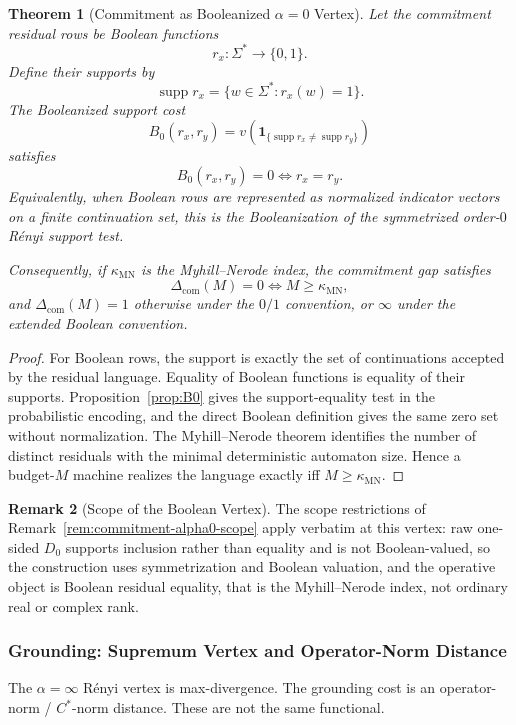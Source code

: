 \documentclass[12pt]{article}
\newtheorem{theorem}{Theorem}[section]
\theoremstyle{definition}
\newtheorem{remark}[theorem]{Remark}
\DeclareMathOperator{\supp}{supp}
\newcommand{\Com}{\Delta_{\mathrm{com}}}
\newcommand{\kappaMN}{\kappa_{\mathrm{MN}}}
\begin{document}
\begin{theorem}[Commitment as Booleanized $\alpha=0$ Vertex]
\label{thm:commitment-alpha0}
Let the commitment residual rows be Boolean functions
\[
r_x:\Sigma^*\to\{0,1\}.
\]
Define their supports by
\[
\supp r_x=\{w\in\Sigma^*:r_x(w)=1\}.
\]
The Booleanized support cost
\[
B_0(r_x,r_y)
=
v(\mathbf 1_{\{\supp r_x\neq\supp r_y\}})
\]
satisfies
\[
B_0(r_x,r_y)=0
\iff
r_x=r_y.
\]
Equivalently, when Boolean rows are represented as normalized indicator
vectors on a finite continuation set, this is the Booleanization of the
symmetrized order-$0$ R\'enyi support test.

Consequently, if $\kappaMN$ is the Myhill--Nerode index, the commitment gap
satisfies
\[
\Com(M)=0
\iff
M\ge\kappaMN,
\]
and $\Com(M)=1$ otherwise under the $0/1$ convention, or $\infty$ under the
extended Boolean convention.
\end{theorem}

\begin{proof}
For Boolean rows, the support is exactly the set of continuations accepted by
the residual language.  Equality of Boolean functions is equality of their
supports.  Proposition~\ref{prop:B0} gives the support-equality test in the
probabilistic encoding, and the direct Boolean definition gives the same zero
set without normalization.  The Myhill--Nerode theorem identifies the number of
distinct residuals with the minimal deterministic automaton size.  Hence a
budget-$M$ machine realizes the language exactly iff $M\ge\kappaMN$.
\end{proof}

\begin{remark}[Scope of the Boolean Vertex]
\label{rem:exponent-alpha0-scope}
The scope restrictions of Remark~\ref{rem:commitment-alpha0-scope} apply
verbatim at this vertex: raw one-sided $D_0$ supports inclusion rather than
equality and is not Boolean-valued, so the construction uses symmetrization and
Boolean valuation, and the operative object is Boolean residual equality, that
is the Myhill--Nerode index, not ordinary real or complex rank.
\end{remark}

\subsubsection{Grounding: Supremum Vertex and Operator-Norm Distance}
\label{subsubsec:exponent-grounding}

The $\alpha=\infty$ R\'enyi vertex is max-divergence.  The grounding cost is
an operator-norm / $C^*$-norm distance.  These are not the same functional.
\end{document}
